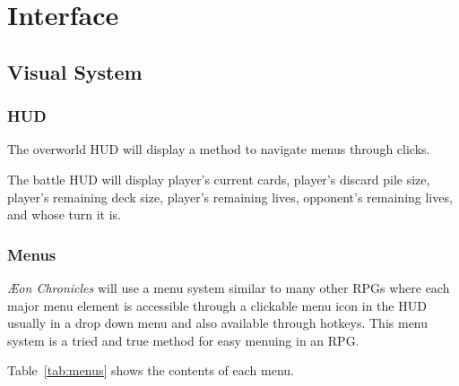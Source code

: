\documentclass[12pt,titlepage]{article}
\newcommand\gametitle{\textit{\AE on Chronicles}\xspace}
\begin{document}



\newpage
\section{Interface}

\subsection{Visual System}

\subsubsection{HUD}

The overworld HUD will display a method to navigate menus through clicks.

The battle HUD will display player's current cards, player's discard pile size,
player's remaining deck size, player's remaining lives, opponent's remaining
lives, and whose turn it is.

\subsubsection{Menus}
\label{sec:menus}

\gametitle will use a menu system similar to many other RPGs where each major
menu element is accessible through a clickable menu icon in the HUD usually in
a drop down menu and also available through hotkeys. This menu system is a
tried and true method for easy menuing in an RPG.

Table~\ref{tab:menus} shows the contents of each menu.
\end{document}

